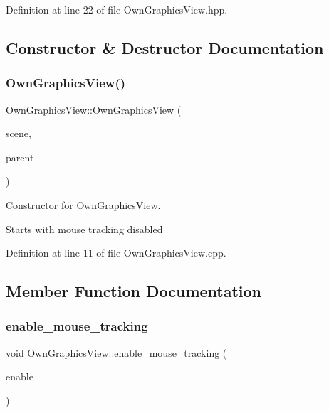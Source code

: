 Definition at line 22 of file Own\+Graphics\+View.\+hpp.



\subsection{Constructor \& Destructor Documentation}
\mbox{\label{classOwnGraphicsView_a57f2f9617077ce2a1d30ec3f6c7144db}} 
\subsubsection{\texorpdfstring{Own\+Graphics\+View()}{OwnGraphicsView()}}
{\footnotesize\ttfamily Own\+Graphics\+View\+::\+Own\+Graphics\+View (\begin{DoxyParamCaption}\item[{Q\+Graphics\+Scene $\ast$}]{scene,  }\item[{Q\+Widget $\ast$}]{parent }\end{DoxyParamCaption})}



Constructor for \mbox{\hyperlink{classOwnGraphicsView}{Own\+Graphics\+View}}. 

Starts with mouse tracking disabled 

Definition at line 11 of file Own\+Graphics\+View.\+cpp.



\subsection{Member Function Documentation}
\mbox{\label{classOwnGraphicsView_a4902ca3c748bc13040c4d869bf7be291}} 
\subsubsection{\texorpdfstring{enable\+\_\+mouse\+\_\+tracking}{enable\_mouse\_tracking}}
{\footnotesize\ttfamily void Own\+Graphics\+View\+::enable\+\_\+mouse\+\_\+tracking (\begin{DoxyParamCaption}\item[{bool}]{enable }\end{DoxyParamCaption})\hspace{0.3cm}{\ttfamily [slot]}}



